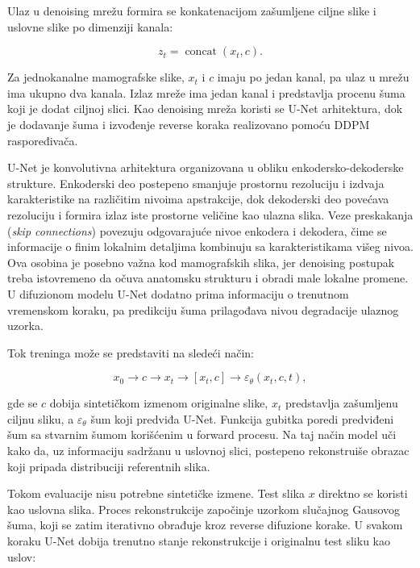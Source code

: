 \documentclass[10pt]{article}
\begin{document}
	Ulaz u denoising mrežu formira se konkatenacijom zašumljene ciljne slike i uslovne slike po dimenziji kanala:
	
	\begin{equation}
		z_t = \operatorname{concat}(x_t,c).
	\end{equation}
	
	Za jednokanalne mamografske slike, $x_t$ i $c$ imaju po jedan kanal, pa ulaz u mrežu ima ukupno dva kanala. Izlaz mreže ima jedan kanal i predstavlja procenu šuma koji je dodat ciljnoj slici. Kao denoising mreža koristi se U-Net arhitektura, dok je dodavanje šuma i izvođenje reverse koraka realizovano pomoću DDPM raspoređivača. \newline
	
	U-Net je konvolutivna arhitektura organizovana u obliku enkodersko-dekoderske strukture. Enkoderski deo postepeno smanjuje prostornu rezoluciju i izdvaja karakteristike na različitim nivoima apstrakcije, dok dekoderski deo povećava rezoluciju i formira izlaz iste prostorne veličine kao ulazna slika. Veze preskakanja (\textit{skip connections}) povezuju odgovarajuće nivoe enkodera i dekodera, čime se informacije o finim lokalnim detaljima kombinuju sa karakteristikama višeg nivoa. Ova osobina je posebno važna kod mamografskih slika, jer denoising postupak treba istovremeno da očuva anatomsku strukturu i obradi male lokalne promene. U difuzionom modelu U-Net dodatno prima informaciju o trenutnom vremenskom koraku, pa predikciju šuma prilagođava nivou degradacije ulaznog uzorka.
	
	
	Tok treninga može se predstaviti na sledeći način:
	
	\begin{equation}
		x_0
		\longrightarrow
		c
		\longrightarrow
		x_t
		\longrightarrow
		[x_t,c]
		\longrightarrow
		\varepsilon_{\theta}(x_t,c,t),
	\end{equation}
	
	gde se $c$ dobija sintetičkom izmenom originalne slike, $x_t$ predstavlja zašumljenu ciljnu sliku, a $\varepsilon_{\theta}$ šum koji predviđa U-Net. Funkcija gubitka poredi predviđeni šum sa stvarnim šumom korišćenim u forward procesu. Na taj način model uči kako da, uz informaciju sadržanu u uslovnoj slici, postepeno rekonstruiše obrazac koji pripada distribuciji referentnih slika.
	
	Tokom evaluacije nisu potrebne sintetičke izmene. Test slika $x$ direktno se koristi kao uslovna slika. Proces rekonstrukcije započinje uzorkom slučajnog Gausovog šuma, koji se zatim iterativno obrađuje kroz reverse difuzione korake. U svakom koraku U-Net dobija trenutno stanje rekonstrukcije i originalnu test sliku kao uslov:
	
\end{document}
